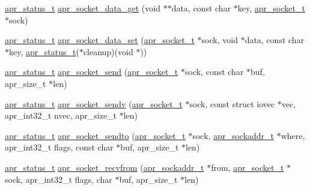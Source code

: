\begin{DoxyCompactItemize}
\item 
\hyperlink{group__apr__errno_gaf76ee4543247e9fb3f3546203e590a6c}{apr\-\_\-status\-\_\-t} \hyperlink{group__apr__network__io_gae76b48d0224a608b4ddb8bd00582eaa7}{apr\-\_\-socket\-\_\-data\-\_\-get} (void $\ast$$\ast$data, const char $\ast$key, \hyperlink{group__apr__network__io_ga49262b223e7434746e1f1737659aa2c3}{apr\-\_\-socket\-\_\-t} $\ast$sock)
\item 
\hyperlink{group__apr__errno_gaf76ee4543247e9fb3f3546203e590a6c}{apr\-\_\-status\-\_\-t} \hyperlink{group__apr__network__io_gafec197f3aa9a495801cdf7892ff8dcb5}{apr\-\_\-socket\-\_\-data\-\_\-set} (\hyperlink{group__apr__network__io_ga49262b223e7434746e1f1737659aa2c3}{apr\-\_\-socket\-\_\-t} $\ast$sock, void $\ast$data, const char $\ast$key, \hyperlink{group__apr__errno_gaf76ee4543247e9fb3f3546203e590a6c}{apr\-\_\-status\-\_\-t}($\ast$cleanup)(void $\ast$))
\item 
\hyperlink{group__apr__errno_gaf76ee4543247e9fb3f3546203e590a6c}{apr\-\_\-status\-\_\-t} \hyperlink{group__apr__network__io_ga943268245cf59f6ff8cf1458c9a9ba8d}{apr\-\_\-socket\-\_\-send} (\hyperlink{group__apr__network__io_ga49262b223e7434746e1f1737659aa2c3}{apr\-\_\-socket\-\_\-t} $\ast$sock, const char $\ast$buf, apr\-\_\-size\-\_\-t $\ast$len)
\item 
\hyperlink{group__apr__errno_gaf76ee4543247e9fb3f3546203e590a6c}{apr\-\_\-status\-\_\-t} \hyperlink{group__apr__network__io_ga99ece70c34a7a332daa3941de3950c64}{apr\-\_\-socket\-\_\-sendv} (\hyperlink{group__apr__network__io_ga49262b223e7434746e1f1737659aa2c3}{apr\-\_\-socket\-\_\-t} $\ast$sock, const struct iovec $\ast$vec, apr\-\_\-int32\-\_\-t nvec, apr\-\_\-size\-\_\-t $\ast$len)
\item 
\hyperlink{group__apr__errno_gaf76ee4543247e9fb3f3546203e590a6c}{apr\-\_\-status\-\_\-t} \hyperlink{group__apr__network__io_ga03ae34bc5712dac2b3fdee39e5f87be3}{apr\-\_\-socket\-\_\-sendto} (\hyperlink{group__apr__network__io_ga49262b223e7434746e1f1737659aa2c3}{apr\-\_\-socket\-\_\-t} $\ast$sock, \hyperlink{structapr__sockaddr__t}{apr\-\_\-sockaddr\-\_\-t} $\ast$where, apr\-\_\-int32\-\_\-t flags, const char $\ast$buf, apr\-\_\-size\-\_\-t $\ast$len)
\item 
\hyperlink{group__apr__errno_gaf76ee4543247e9fb3f3546203e590a6c}{apr\-\_\-status\-\_\-t} \hyperlink{group__apr__network__io_ga80880312b41e86c9c266ede1a504e2ca}{apr\-\_\-socket\-\_\-recvfrom} (\hyperlink{structapr__sockaddr__t}{apr\-\_\-sockaddr\-\_\-t} $\ast$from, \hyperlink{group__apr__network__io_ga49262b223e7434746e1f1737659aa2c3}{apr\-\_\-socket\-\_\-t} $\ast$sock, apr\-\_\-int32\-\_\-t flags, char $\ast$buf, apr\-\_\-size\-\_\-t $\ast$len)
$$
\end{DoxyCompactItemize}
